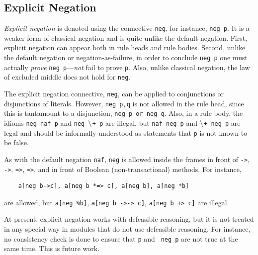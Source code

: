 \documentclass[11pt]{article}
\newcommand{\PLGNAF}{\mbox{\tt \ensuremath{\tt\backslash}+}\xspace}
\newcommand{\RULELOGNAF}{{{\tt naf}}\xspace}
\begin{document}
\subsection{Explicit Negation}
\label{sec-explicit-negation}

\emph{Explicit negation} is denoted using the connective {\tt neg}, for
instance, {\tt neg p}. It is a weaker form of classical negation and is
quite unlike the default negation. First, explicit negation can appear both
in rule heads and rule bodies. Second, unlike the default negation or
negation-as-failure, in order to conclude {\tt neg p} one must actually
\emph{prove} {\tt neg p}---\emph{not} fail to prove {\tt p}. Also, unlike
classical negation, the law of excluded middle does not hold for {\tt neg}.

The explicit negation connective, {\tt neg}, can be applied to conjunctions
or disjunctions of literals. However, {\tt neg p,q} is not allowed in the
rule head, since this is tantamount to a disjunction, {\tt neg p or neg q}.  
Also, in a rule body, the idioms {\tt neg naf p} and {\tt neg \PLGNAF p} are
illegal, but {\tt naf neg p} and {\tt \PLGNAF neg p} are legal and should be
informally understood as statements that {\tt p} is not known to be false. 

As with the default negation \RULELOGNAF, {\tt neg} is allowed inside the
frames 
in front of {\tt ->}, {\tt *->}, {\tt =>}, {\tt *=>}, and in front of
Boolean (non-transactional) methods. For instance,
\begin{verbatim}
    a[neg b->c], a[neg b *=> c], a[neg b], a[neg *b]
\end{verbatim}
are allowed, but {\tt a[neg \%b]}, {\tt a[neg b ->-> c]}, {\tt a[neg b
  +> c]} are illegal.  

At present, explicit negation works with defeasible reasoning, but it is
not treated in any special way in modules that do not use defeasible reasoning.
For instance, no consistency check is done to ensure that {\tt p} and {\tt
  neg p} are not true at the same time. This is future work.
\end{document}
